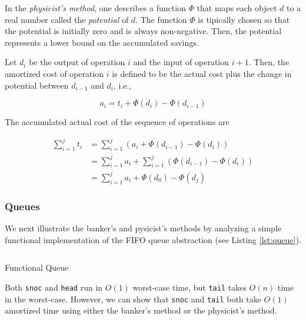 \documentclass[12pt, a4paper]{article} %
\newcommand{\code}[1]{\texttt{#1}} %
\begin{document}
In the \textit{physicist's method}, one describes a function $\Phi$ that maps each object $d$ to a real number called the \textit{potential} of $d$. The function $\Phi$ is tipically chosen so that the potential is initially zero and is always non-negative. Then, the potential represents a lower bound on the accumulated savings.

Let $d_i$ be the output of operation $i$ and the input of operation $i+1$. Then, the amortized cost of operation $i$ is defined to be the actual cost plus the change in potential between $d_{i-1}$ and $d_i$, i.e.,

\begin{equation}%
\label{physicist's method equation}
  a_i = t_i + \Phi(d_i) - \Phi(d_{i-1})
\end{equation}

The accumulated actual cost of the sequence of operations are

\begin{align*}%
\label{physicist's cost}
  \sum_{i=1}^{j} t_i &= \sum_{i=1}^{j} (a_i + \Phi(d_{i-1}) - \Phi(d_i)) \\
                     &= \sum_{i=1}^{j} a_i + \sum_{i=1}^{j} (\Phi(d_{i-1}) - \Phi(d_i)) \\
                     &= \sum_{i=1}^{j} a_i + \Phi(d_0) - \Phi(d_j)
\end{align*}


\subsubsection{Queues}%
\label{subsub:Queues}

We next illustrate the banker's and pysicist's methods by analyzing a simple functional implementation of the FIFO queue abstraction (see Listing \ref{lst:queue}).

\begin{listing}[h]
    \inputminted{haskell}{../../Chapter5/BatchedQueue.hs}
    \caption{Functional Queue}
    \label{lst:queue}
\end{listing}

Both \code{snoc} and \code{head} run in $O(1)$ worst-case time, but \code{tail} takes $O(n)$ time in the worst-case. However, we can show that \code{snoc} and \code{tail} both take $O(1)$ amortized time using either the banker's method or the physicist's method.
\end{document}
